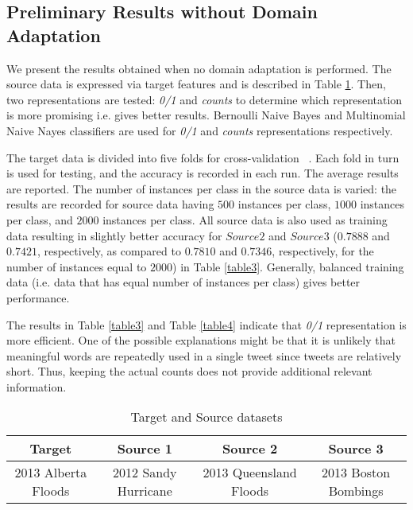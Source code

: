 \subsection{Preliminary Results without Domain Adaptation}
\label{preresults}

We present the results obtained when no domain adaptation is performed. The source data is expressed via target features and is described in Table \ref{table1}. Then, two representations are tested: \textit{0/1} and \textit{counts} to determine which representation is more promising i.e. gives better results. Bernoulli Naive Bayes and Multinomial Naive Nayes classifiers are used for \textit{0/1} and \textit{counts} representations respectively. 

The target data is divided into five folds for cross-validation ~\citep{hastie}. Each fold in turn is used for testing, and the accuracy is recorded in each run. The average results are reported. The number of instances per class in the source data is varied: the results are recorded for source data having $500$ instances per class, $1000$ instances per class, and $2000$ instances per class. All source data is also used as training data resulting in slightly better accuracy for $Source 2$ and $Source  3$ ($0.7888$ and $0.7421$, respectively, as compared to $0.7810$ and $0.7346$, respectively, for the number of instances equal to $2000$) in Table \ref{table3}. Generally, balanced training data (i.e. data that has equal number of instances per class) gives better performance.

The results in Table \ref{table3} and Table \ref{table4} indicate that \textit{0/1} representation is more efficient. One of the possible explanations might be that it is unlikely that meaningful words are repeatedly used in a single tweet since tweets are relatively short. Thus, keeping the actual counts does not provide additional relevant information.


\begin{table}[ht]
    \begin{center}
    \caption{Target and Source datasets}
    \begin{tabular}[c]{|c|c|c|c|}
        \hline
        Target & Source 1 & Source 2 & Source 3 \\
        \hline
        2013 Alberta Floods & 2012 Sandy Hurricane & 2013 Queensland Floods & 2013 Boston Bombings \\
        \hline
    \end{tabular}
    \label{table1}
   \end{center}
\end{table}


